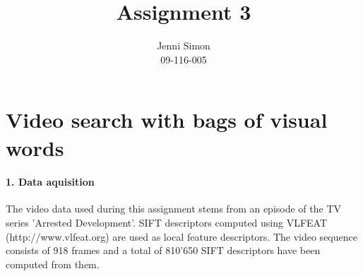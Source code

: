 \documentclass{paper}
\title{Assignment 3}
\author{Jenni Simon\\09-116-005}
\begin{document}
\maketitle


%

\section*{Video search with bags of visual words}


\paragraph{1. Data aquisition}

The video data used during this assignment stems from an episode of the TV series 'Arrested Development'. SIFT descriptors computed using VLFEAT (http://www.vlfeat.org) are used as local feature descriptors. The video sequence consists of 918 frames and a total of 810'650 SIFT descriptors have been computed from them.
\end{document}
